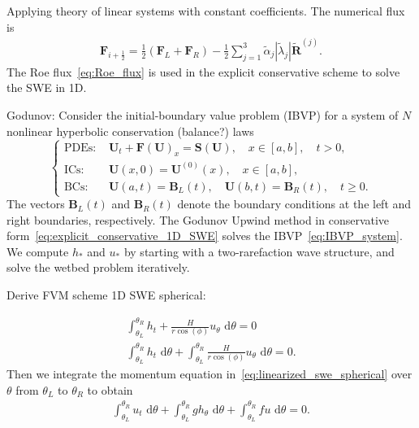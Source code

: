 Applying theory of linear systems with constant coefficients.
The numerical flux is
\begin{align}\label{eq:Roe_flux}
    \mathbf{F}_{i+\frac{1}{2}} = \frac{1}{2} \left( \mathbf{F}_L + \mathbf{F}_R \right) - \frac{1}{2} \sum_{j=1}^3 \tilde{\alpha}_j \left| \tilde{\lambda}_j \right| \tilde{\mathbf{R}}^{(j)}.
\end{align}
The Roe flux~\eqref{eq:Roe_flux} is used in the explicit conservative scheme to solve the SWE in 1D.

Godunov:
Consider the initial-boundary value problem (IBVP) for a system of $N$ nonlinear hyperbolic conservation (balance?) laws     
\begin{equation}\label{eq:IBVP_system}
    \begin{cases}
    \text{PDEs: }    &\mathbf{U}_t + \mathbf{F(U)}_x = \mathbf{S(U)}, \quad x \in [a, b], \quad t > 0, \\
    \text{ICs: }    &\mathbf{U}(x,0) = \mathbf{U}^{(0)}(x), \quad x \in [a,b], \\
    \text{BCs: }    &\mathbf{U}(a,t) = \mathbf{B}_{L}(t), \quad \mathbf{U}(b,t) = \mathbf{B}_{R}(t), \quad t \geq 0.
    \end{cases}
\end{equation}
The vectors $\mathbf{B}_L (t)$ and $\mathbf{B}_R (t)$ denote the boundary conditions at the left and right boundaries, respectively.
The Godunov Upwind method in conservative form~\eqref{eq:explicit_conservative_1D_SWE} solves the IBVP~\eqref{eq:IBVP_system}.
We compute $h_*$ and $u_*$ by starting with a two-rarefaction wave structure, and solve the wetbed problem iteratively.


Derive FVM scheme 1D SWE spherical:




\begin{align}
    \int_{\theta_L}^{\theta_R} h_t + \frac{H}{r \cos(\phi)} u_\theta \text{ d}\theta = 0 \\
    \int_{\theta_L}^{\theta_R} h_t \text{ d}\theta + \int_{\theta_L}^{\theta_R} \frac{H}{r \cos(\phi)} u_\theta \text{ d}\theta = 0.
\end{align}
Then we integrate the momentum equation in~\eqref{eq:linearized_swe_spherical} over $\theta$ from $\theta_L$ to $\theta_R$ to obtain
\begin{align*}
    \int_{\theta_L}^{\theta_R} u_t \text{ d}\theta + \int_{\theta_L}^{\theta_R} g h_\theta \text{ d}\theta + \int_{\theta_L}^{\theta_R} fu \text{ d} \theta = 0.
\end{align*}


